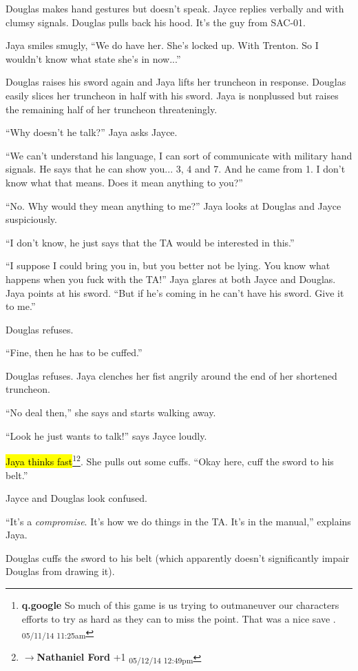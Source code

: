 Douglas makes hand gestures but doesn't speak.  Jayce replies verbally and with clumsy signals.  Douglas pulls back his hood.  It's the guy from SAC-01.

Jaya smiles smugly, ``We do have her.  She's locked up.  With Trenton.  So I wouldn't know what state she's in now...''

Douglas raises his sword again and Jaya lifts her truncheon in response.  Douglas easily slices her truncheon in half with his sword.  Jaya is nonplussed but raises the remaining half of her truncheon threateningly.

``Why doesn't he talk?'' Jaya asks Jayce.

``We can't understand his language, I can sort of communicate with military hand signals.  He says that he can show you... 3, 4 and 7.  And he came from 1.  I don't know what that means.  Does it mean anything to you?''

``No.  Why would they mean anything to me?''  Jaya looks at Douglas and Jayce suspiciously. 

``I don't know, he just says that the TA would be interested in this.''

``I suppose I could bring you in, but you better not be lying.  You know what happens when you fuck with the TA!''  Jaya glares at both Jayce and Douglas.  Jaya points at his sword.  ``But if he's coming in he can't have his sword. Give it to me.''

Douglas refuses.

``Fine, then he has to be cuffed.''

Douglas refuses.  Jaya clenches her fist angrily around the end of her shortened truncheon.

``No deal then,'' she says and starts walking away.

``Look he just wants to talk!'' says Jayce loudly.

\hl{Jaya thinks fast}\footnote{\textbf{q.google }So much of this game is us trying to outmaneuver our characters efforts to try as hard as they can to miss the point. That was a nice save . \textsubscript{05/11/14 11:25am}}\footnote{$\rightarrow$\textbf{Nathaniel Ford }+1 \textsubscript{05/12/14 12:49pm}}.  She pulls out some cuffs.  ``Okay here, cuff the sword to his belt.''

Jayce and Douglas look confused.

``It's a \textit{compromise}.  It's how we do things in the TA.  It's in the manual,'' explains Jaya.

Douglas cuffs the sword to his belt (which apparently doesn't significantly impair Douglas from drawing it).


